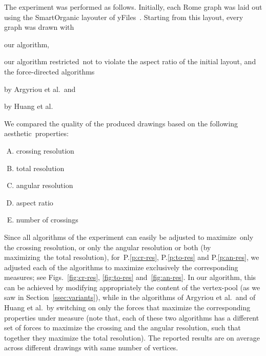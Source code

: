 \documentclass[runningheads]{llncs}
\begin{document}
The experiment was performed as follows. Initially, each Rome graph was laid out using the SmartOrganic layouter of yFiles~\cite{DBLP:books/sp/04/WieseE004}. Starting from this layout, every graph was drawn with 
\begin{inparaenum}[(i)]
\item our algorithm, 
\item our algorithm restricted~not to violate the aspect ratio of the initial layout, and the force-directed algorithms
\item by Argyriou et al.\ and
\item by Huang et al.
\end{inparaenum}
%
We compared the quality of the produced drawings based on the following aesthetic~properties:
%
\begin{multicols}{2}
\begin{enumerate}[P.1.]
\item \label{p:cr-res} crossing resolution 
\item \label{p:to-res} total resolution 
\item \label{p:an-res} angular resolution 
\columnbreak
\item \label{p:as-rat} aspect ratio
\item \label{p:no-xing} number of crossings
\end{enumerate}
\end{multicols}
%
Since all algorithms of the experiment can easily be adjusted to maximize~only the crossing resolution, or only the angular resolution or both (by maximizing~the total resolution), for~P.\ref*{p:cr-res}, P.\ref*{p:to-res} and P.\ref*{p:an-res}, we adjusted each of the algorithms to maximize exclusively the corresponding measures; see Figs.~\ref{fig:cr-res}, \ref{fig:to-res} and~\ref{fig:an-res}. In our algorithm, this can be achieved by modifying appropriately the content of the vertex-pool (as we saw in Section~\ref{ssec:variants}), while in the algorithms of Argyriou et al.\ and of Huang et al.\ by switching on only the forces that maximize the corresponding properties under measure (note that, each of these two algorithms has a different set of forces to maximize the crossing and the angular resolution, such that together they maximize the total resolution). The reported results are on average across different drawings with same number of vertices. 
\end{document}
